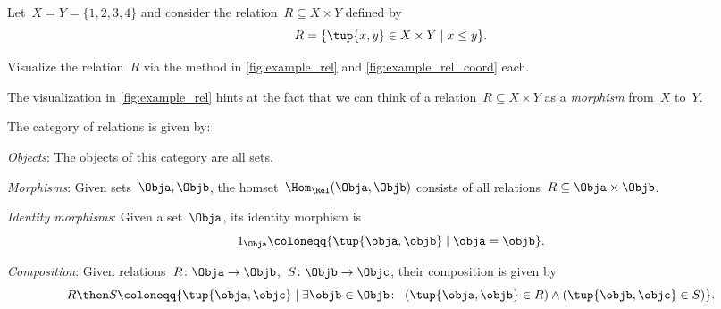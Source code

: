 \begin{exercise}
  Let~$X = Y = \{1, 2, 3, 4 \}$ and consider the relation~$R \subseteq X \times Y$ defined by
  \begin{equation}
    R = \{ \tup{x,y} \in X \times Y \mid x \leq y \}.
  \end{equation}

  Visualize the relation~$R$ via the method in \cref{fig:example_rel} and \cref{fig:example_rel_coord} each.
\end{exercise}

The visualization in \cref{fig:example_rel} hints at the fact that we can think of a relation~$R \subseteq X \times Y$ as a \emph{morphism} from~$X$ to~$Y$.

\begin{ctdefinition}
  The category \iindex{\Rel} of relations \Rel is given by:
  \begin{compactenum}
    \item \emph{Objects}: The objects of this category are all sets.
    \item \emph{Morphisms}: Given sets~$\Obja, \Objb$, the homset~$\Hom_{\Rel}(\Obja,\Objb)$ consists of all
    relations~$R\subseteq \Obja\times \Objb$.
    \item \emph{Identity morphisms}: Given a set~$\Obja$, its identity morphism is
    \begin{equation}
      1_\Obja \coloneqq \{ \tup{\obja,\objb} \mid  \obja = \objb \}.
    \end{equation}
    \item \emph{Composition}: Given relations~$R \colon \Obja\to \Objb$,~$S\colon \Objb\to \Objc$, their composition is given by
    \begin{equation}
      \label{RelCompRule}
      R \then S \coloneqq \{\tup{\obja,\objc} \mid  \exists \objb \in \Objb \colon \ \left(\tup{\obja,\objb} \in R\right) \wedge \left(\tup{\objb,\objc} \in S\right)\}.
    \end{equation}
  \end{compactenum}
\end{ctdefinition}


